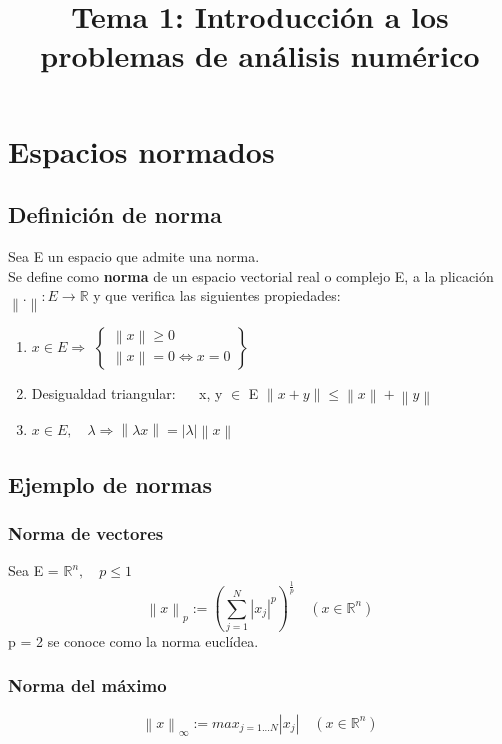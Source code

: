 \documentclass[a4paper , 11pt, spanish ]{article}
\title{ Tema 1: Introducción a los problemas de análisis numérico}
\newcommand{\norm}[1]{\left\lVert#1\right\rVert}
\begin{document}
\fi


\maketitle 
\section{Espacios normados} 
\subsection{Definición de norma} 
Sea E un espacio que admite una norma. \\
Se define como \textbf{ norma} de un espacio vectorial real o complejo E, a la plicación $\norm{.} : E \longrightarrow \mathbb{R} $ y que verifica las siguientes propiedades: \\
\begin{enumerate}
\item $ x \in E  \Rightarrow $ $\begin{Bmatrix}
	\norm{x} \ge 0\\
	\norm{x} = 0 \Leftrightarrow x = 0
\end{Bmatrix}$

\item  Desigualdad triangular: $\quad$ x, y $\in $ E $\norm{ x + y } \le \norm{x} + \norm{y}$

\item  $ x \in E, \quad \lambda \Rightarrow \norm{ \lambda x} = |\lambda | \norm{x}$
\end{enumerate}
\subsection{Ejemplo de normas}
\subsubsection*{ Norma de vectores} 
Sea E = $\mathbb{R}^n ,\quad p \le 1$ 
\[\norm{x}_p :=  {(\sum_{j=1}^{N} |x_j|^p )} ^{\frac{1}{p}} \quad ( x \in \mathbb{R}^n)\]
p = 2 se conoce como la norma euclídea. 
\subsubsection*{Norma del máximo}
\[ \norm{x}_\infty := max _{ j=1...N} | x_j | \quad ( x \in \mathbb{R}^n)\]
\end{document}
